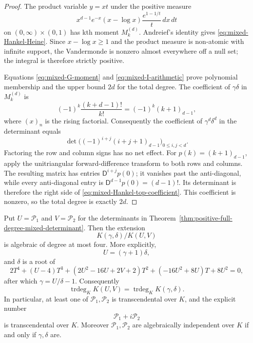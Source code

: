 \begin{proof}
The product variable $y=xt$ under the positive measure
\[
 x^{d-1}e^{-x}(x-\log x)
 \frac{e^{1-1/t}}t\,dx\,dt
\]
on $(0,\infty)\times(0,1)$ has kth moment $M_k^{(d)}$.
Andreief's identity gives \eqref{eq:mixed-Hankel-Heine}.  Since
$x-\log x\geq1$ and the product measure is non-atomic with infinite
support, the Vandermonde is nonzero almost everywhere off a null set;
the integral is therefore strictly positive.

Equations \eqref{eq:mixed-G-moment} and
\eqref{eq:mixed-I-arithmetic} prove polynomial membership and the upper
bound $2d$ for the total degree.  The coefficient of $\gamma\delta$ in
$M_k^{(d)}$ is
\[
 (-1)^k\frac{(k+d-1)!}{k!}
 =(-1)^k(k+1)_{d-1},
\]
where $(x)_n$ is the rising factorial.  Consequently the coefficient of
$\gamma^d\delta^d$ in the determinant equals
\[
 \det\bigl((-1)^{i+j}(i+j+1)_{d-1}\bigr)_{0\leq i,j<d}.
\]
Factoring the row and column signs has no net effect.  For
$p(k)=(k+1)_{d-1}$, apply the unitriangular forward-difference transform
to both rows and columns.  The resulting matrix has entries
$\mathsf D^{i+j}p(0)$; it vanishes past the anti-diagonal, while every
anti-diagonal entry is
$\mathsf D^{d-1}p(0)=(d-1)!$.  Its determinant is therefore the right
side of \eqref{eq:mixed-Hankel-top-coefficient}.  This coefficient is
nonzero, so the total degree is exactly $2d$.
\end{proof}

\begin{proposition}
\label{prop:mixed-hankel-reconstruction}
Put $U=\mathcal P_1$ and $V=\mathcal P_2$ for the determinants in
Theorem~\ref{thm:positive-full-degree-mixed-determinant}.  Then the extension
\[
 K(\gamma,\delta)/K(U,V)
\]
is algebraic of degree at most four.  More explicitly,
\[
 U=(\gamma+1)\delta,
\]
and $\delta$ is a root of
\begin{equation}\label{eq:mixed-hankel-quartic}
 2T^4+(U-4)T^3
 +(2U^2-16U+2V+2)T^2
 +(-16U^2+8U)T+8U^2=0,
\end{equation}
after which $\gamma=U/\delta-1$.
Consequently
\[
 \operatorname{trdeg}_K K(U,V)
 =\operatorname{trdeg}_K K(\gamma,\delta).
\]
In particular, at least one of $\mathcal P_1,\mathcal P_2$ is
transcendental over $K$, and the explicit number
\[
 \mathcal P_1+i\mathcal P_2
\]
is transcendental over $K$.  Moreover $\mathcal P_1,\mathcal P_2$ are
algebraically independent over $K$ if and only if $\gamma,\delta$ are.
\end{proposition}

